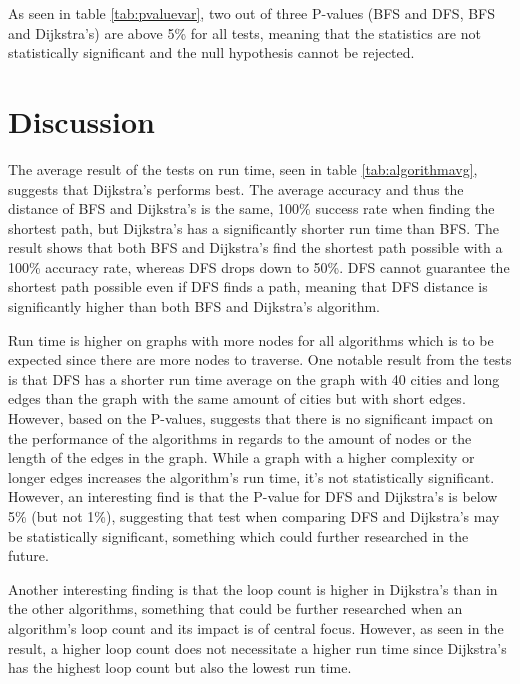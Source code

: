 \documentclass{csfourzero}
\begin{document}
As seen in table \ref{tab:pvaluevar}, two out of three P-values (BFS and DFS, BFS and Dijkstra's) are above 5\% for all tests, meaning that the statistics are not statistically significant and the null hypothesis cannot be rejected. 

\vspace{2cm} 


\section{Discussion}
\label{sec:Discussion}
 The average result of the tests on run time, seen in table \ref{tab:algorithmavg}, suggests that Dijkstra's performs best. The average accuracy and thus the distance of BFS and Dijkstra's is the same, 100\% success rate when finding the shortest path, but Dijkstra's has a significantly shorter run time than BFS. The result shows that both BFS and Dijkstra's find the shortest path possible with a 100\% accuracy rate, whereas DFS drops down to 50\%. DFS cannot guarantee the shortest path possible even if DFS finds a path, meaning that DFS distance is significantly higher than both BFS and Dijkstra's algorithm. 

Run time is higher on graphs with more nodes for all algorithms which is to be expected since there are more nodes to traverse. One notable result from the tests is that DFS has a shorter run time average on the graph with 40 cities and long edges than the graph with the same amount of cities but with short edges. However,  based on the P-values, suggests that there is no significant impact on the performance of the algorithms in regards to the amount of nodes or the length of the edges in the graph. While a graph with a higher complexity or longer edges increases the algorithm's run time, it's not statistically significant. However, an interesting find is that the P-value for DFS and Dijkstra's is below 5\% (but not 1\%), suggesting that test when comparing DFS and Dijkstra's may be statistically significant, something which could further researched in the future. 


Another interesting finding is that the loop count is higher in Dijkstra's than in the other algorithms, something that could be further researched when an algorithm's loop count and its impact is of central focus. However, as seen in the result, a higher loop count does not necessitate a higher run time since Dijkstra's has the highest loop count but also the lowest run time.
\end{document}
